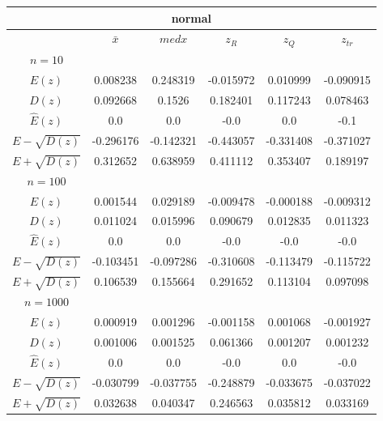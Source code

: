 \begin{tabular}{|c | c | c | c | c | c|} 
 \hline \multicolumn{6}{|c|}{normal} \\ 
 \hline & $\bar{x}$ & $medx$ & $z_R$ & $z_Q$ & $z_{tr}$ 
 \\ \hline $n=10$ & & & & & \\ 
 \hline $E(z)$ 
 &0.008238 &0.248319 &-0.015972 &0.010999 &-0.090915 \\ 
 \hline $D(z)$ 
 &0.092668 &0.1526 &0.182401 &0.117243 &0.078463 \\ 
\hline $\hat{E}(z)$ 
&0.0&0.0&-0.0&0.0&-0.1 \\ 
\hline $E-\sqrt{D(z)}$ 
&-0.296176&-0.142321&-0.443057&-0.331408&-0.371027 \\ 
\hline $E+\sqrt{D(z)}$ 
&0.312652&0.638959&0.411112&0.353407&0.189197 \\ \hline $n=100$ & & & & & \\ 
 \hline $E(z)$ 
 &0.001544 &0.029189 &-0.009478 &-0.000188 &-0.009312 \\ 
 \hline $D(z)$ 
 &0.011024 &0.015996 &0.090679 &0.012835 &0.011323 \\ 
\hline $\hat{E}(z)$ 
&0.0&0.0&-0.0&-0.0&-0.0 \\ 
\hline $E-\sqrt{D(z)}$ 
&-0.103451&-0.097286&-0.310608&-0.113479&-0.115722 \\ 
\hline $E+\sqrt{D(z)}$ 
&0.106539&0.155664&0.291652&0.113104&0.097098 \\ \hline $n=1000$ & & & & & \\ 
 \hline $E(z)$ 
 &0.000919 &0.001296 &-0.001158 &0.001068 &-0.001927 \\ 
 \hline $D(z)$ 
 &0.001006 &0.001525 &0.061366 &0.001207 &0.001232 \\ 
\hline $\hat{E}(z)$ 
&0.0&0.0&-0.0&0.0&-0.0 \\ 
\hline $E-\sqrt{D(z)}$ 
&-0.030799&-0.037755&-0.248879&-0.033675&-0.037022 \\ 
\hline $E+\sqrt{D(z)}$ 
&0.032638&0.040347&0.246563&0.035812&0.033169 \\ \hline 
 \end{tabular}